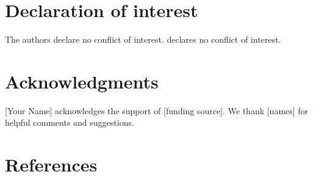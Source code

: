 
\ifonlineappendix\else
    \section*{Declaration of interest}
    \ifblind
        The authors declare no conflict of interest.
     declares no conflict of interest.
    \fi

    \ifblind\else
        \section*{Acknowledgments}
        [Your Name] acknowledges the support of [funding source].
        We thank [names] for helpful comments and suggestions.
    \fi
\fi

\onehalfspacing
\section*{References}


